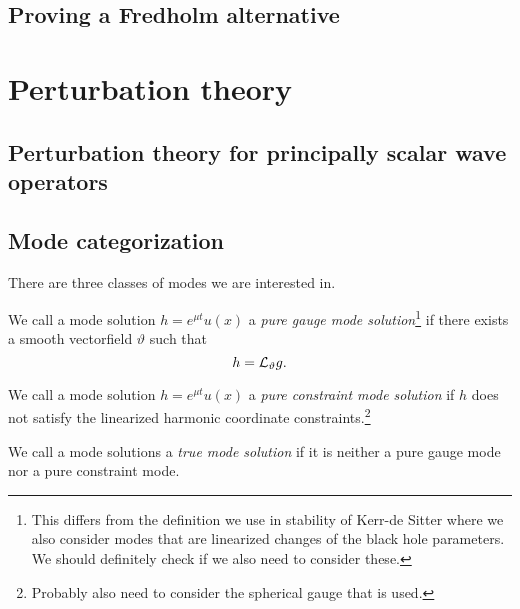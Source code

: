 \documentclass{article}
\begin{document}
\subsection{Proving a Fredholm alternative}

\section{Perturbation theory}

\subsection{Perturbation theory for principally scalar wave operators}

\subsection{Mode categorization}

There are three classes of modes we are interested in.
\begin{definition}
  We call a mode solution $h = e^{\mu t}u(x)$ a \emph{pure gauge mode
    solution}\footnote{This differs from the definition we use in
    stability of Kerr-de Sitter where we also consider modes that are
    linearized changes of the black hole parameters. We should
    definitely check if we also need to consider these.} if there exists a smooth vectorfield
  $\vartheta$ such that
  \begin{equation*}
    h = \mathcal{L}_{\vartheta}g.
  \end{equation*}
\end{definition}

\begin{definition}
  We call a mode solution $h = e^{\mu t}u(x)$ a \emph{pure constraint
    mode solution} if $h$ does not satisfy the linearized harmonic
  coordinate constraints.\footnote{Probably also need to consider the
    spherical gauge that is used.}
\end{definition}

\begin{definition}
  We call a mode solutions a \emph{true mode solution} if it is
  neither a pure gauge mode nor a pure constraint mode. 
\end{definition}
\end{document}
